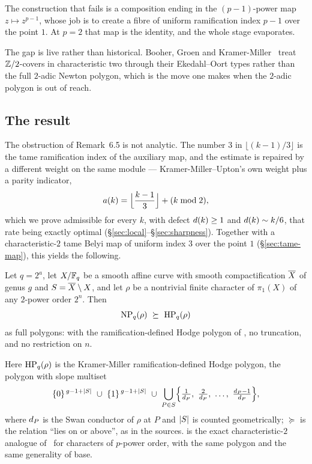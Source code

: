 The construction that fails is a composition ending in the $(p-1)$-power
map $z \mapsto z^{p-1}$, whose job is to create a fibre of uniform
ramification index $p-1$ over the point $1$. At $p = 2$ that map is the
identity, and the whole stage evaporates.

The gap is live rather than historical. Booher, Groen and
Kramer-Miller~\cite{boohergroenkramermiller2025} treat $\mathbb{Z}/2$-covers in
characteristic two through their Ekedahl--Oort types rather than the full
$2$-adic Newton polygon, which is the move one makes when the $2$-adic
polygon is out of reach.

\subsection{The result}
\label{sec:result}

The obstruction of Remark~6.5 is not analytic. The number $3$ in $\lfloor
(k-1)/3 \rfloor$ is the tame ramification index of the auxiliary map, and
the estimate is repaired by a different weight on the same module ---
Kramer-Miller--Upton's own weight plus a parity indicator,
\[
  a(k) = \Bigl\lfloor \frac{k-1}{3} \Bigr\rfloor + (k \bmod 2),
\]
which we prove admissible for every $k$, with defect $d(k) \ge 1$ and
$d(k) \sim k/6$, that rate being exactly optimal
(\S\ref{sec:local}--\S\ref{sec:sharpness}). Together with a
characteristic-$2$ tame Belyi map of uniform index $3$ over the point $1$
(\S\ref{sec:tame-map}), this yields the following.

\begin{theorem}
\label{thm:main}
Let $q = 2^a$, let $X/\mathbb{F}_q$ be a smooth affine curve with smooth
compactification $\overline{X}$ of genus $g$ and $S = \overline{X} \setminus X$, and
let $\rho$ be a nontrivial finite character of $\pi_1(X)$ of any $2$-power
order $2^n$. Then
\[
  \NP_q(\rho) \ \succeq \ \HP_q(\rho)
\]
as full polygons: with the ramification-defined Hodge polygon of
\textup{\cite[\S1.2]{kramermillerupton2021newton}}, no truncation, and no
restriction on $n$.
\end{theorem}

Here $\operatorname{HP}_q(\rho)$ is the Kramer-Miller ramification-defined Hodge polygon,
the polygon with slope multiset
\begin{equation}
\label{eq:hodge-slopes}
  \{0\}^{\,g-1+|S|} \ \cup\ \{1\}^{\,g-1+|S|} \ \cup\
  \bigcup_{P \in S}
  \Bigl\{ \tfrac{1}{d_P},\ \tfrac{2}{d_P},\ \dots,\ \tfrac{d_P-1}{d_P} \Bigr\},
\end{equation}
where $d_P$ is the Swan conductor of $\rho$ at $P$ and $|S|$ is counted
geometrically; $\succeq$ is the relation ``lies on or above'', as in the
sources. \Cref{thm:main} is the exact characteristic-$2$ analogue of~\cite[Theorem~1.1]{kramermiller2020abelian} for characters of $p$-power
order, with the same polygon and the same generality of base.

